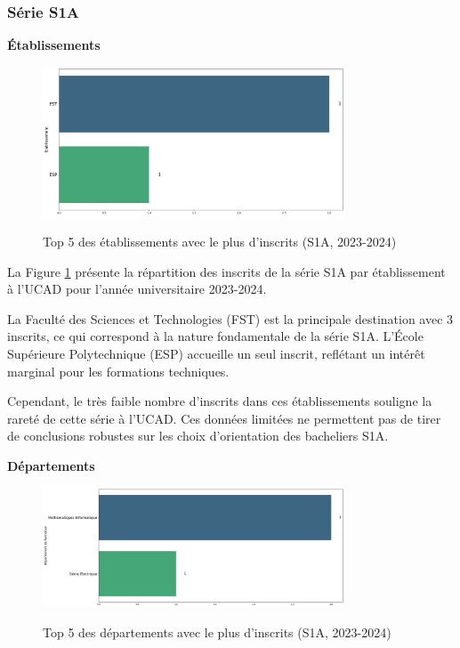 \newpage
\subsubsection{Série S1A}

\textbf{Établissements}

\begin{figure}[ht]
\centering
\caption{Top 5 des établissements avec le plus d'inscrits (S1A, 2023-2024)}
\includegraphics[width=0.8\textwidth]{figure/etab_S1A_2024.png}
\label{fig:etab_s1a_2024}
\end{figure}

La Figure \ref{fig:etab_s1a_2024} présente la répartition des inscrits de la série S1A par établissement à l'UCAD pour l'année universitaire 2023-2024.

La Faculté des Sciences et Technologies (FST) est la principale destination avec 3 inscrits, ce qui correspond à la nature fondamentale de la série S1A. 
L’École Supérieure Polytechnique (ESP) accueille un seul inscrit, reflétant un intérêt marginal pour les formations techniques.

Cependant, le très faible nombre d’inscrits dans ces établissements souligne la rareté de cette série à l’UCAD. 
Ces données limitées ne permettent pas de tirer de conclusions robustes sur les choix d’orientation des bacheliers S1A.

\textbf{Départements}

\begin{figure}[ht]
\centering
\caption{Top 5 des départements avec le plus d'inscrits (S1A, 2023-2024)}
\includegraphics[width=0.8\textwidth]{figure/dep_S1A_2024.png}
\label{fig:dep_s1a_2024}
\end{figure}

